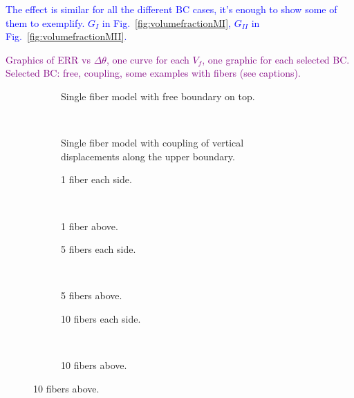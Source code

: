 \documentclass[review]{elsarticle}
\begin{document}
\textcolor{blue}{The effect is similar for all the different BC cases, it's enough to show some of them to exemplify. $G_{I}$ in Fig.~\ref{fig:volumefractionMI}, $G_{II}$ in Fig.~\ref{fig:volumefractionMII}.}

\textcolor{purple}{Graphics of ERR vs $\Delta\theta$, one curve for each $V_{f}$, one graphic for each selected BC. Selected BC: free, coupling, some examples with fibers (see captions).}

\begin{figure}[!h]
\centering
    \begin{subfigure}[b]{0.45\textwidth}
        \caption{Single fiber model with free boundary on top.}\label{subfig:volfracfreeMI}
    \end{subfigure} ~
    \begin{subfigure}[b]{0.45\textwidth}
        \caption{Single fiber model with coupling of vertical displacements along the upper boundary.}\label{subfig:volfraccouplingMI}
    \end{subfigure}

    \begin{subfigure}[b]{0.45\textwidth}
        \caption{1 fiber each side.}\label{subfig:volfrac1eachsideMI}
    \end{subfigure} ~
    \begin{subfigure}[b]{0.45\textwidth}
        \caption{1 fiber above.}\label{subfig:volfrac1aboveMI}
    \end{subfigure}

    \begin{subfigure}[b]{0.45\textwidth}
        \caption{5 fibers each side.}\label{subfig:volfrac5eachsideMI}
    \end{subfigure} ~
    \begin{subfigure}[b]{0.45\textwidth}
        \caption{5 fibers above.}\label{subfig:volfrac5aboveMI}
    \end{subfigure}

    \begin{subfigure}[b]{0.45\textwidth}
        \caption{10 fibers each side.}\label{subfig:volfrac10eachsideMI}
    \end{subfigure} ~
    \begin{subfigure}[b]{0.45\textwidth}
        \caption{10 fibers above.}\label{subfig:volfrac10aboveMI}
    \end{subfigure}


\end{figure}
\end{document}

